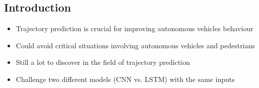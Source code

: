 \documentclass[a0,portrait]{a0poster}
\begin{document}
\begin{multicols}{2} %


\color{DarkSlateGray}%





\color{DarkSlateGray} %

\section*{Introduction}

\begin{itemize}
	\justifying
\item Trajectory prediction is crucial for improving autonomous vehicles behaviour
\item Could avoid critical situations involving autonomous vehicles and pedestrians
\item Still a lot to discover in the field of trajectory prediction
\item Challenge two different models (CNN vs. LSTM) with the same inputs
\end{itemize}



\end{multicols}
\end{document}

